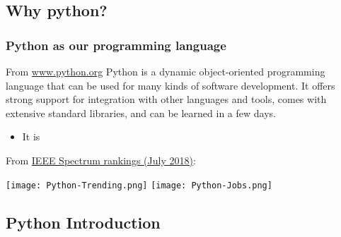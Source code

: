 \documentclass[hyperref={colorlinks=true}]{beamer}
\begin{document}
\subsection[Why python?]{Why python?}

\begin{frame}%
  \frametitle{Python as our programming language}
    
  \begin{ucblock}{From \url{www.python.org}}
    Python is a dynamic object-oriented programming language that can be used for many kinds of software development. It offers strong support for integration with other languages and tools, comes with extensive standard libraries, and can be learned in a few days.
  \end{ucblock}
  
  
  \begin{itemize}
    \item It is 
  \end{itemize}
    
  From \href{https://spectrum.ieee.org/static/interactive-the-top-programming-languages-2018}{IEEE Spectrum rankings (July 2018)}:

  \begin{center}
    \texttt{[image: Python-Trending.png]}
    \texttt{[image: Python-Jobs.png]}
  \end{center}  
    
\end{frame}

\subsection[Python Introduction]{Python Introduction}
\end{document}
